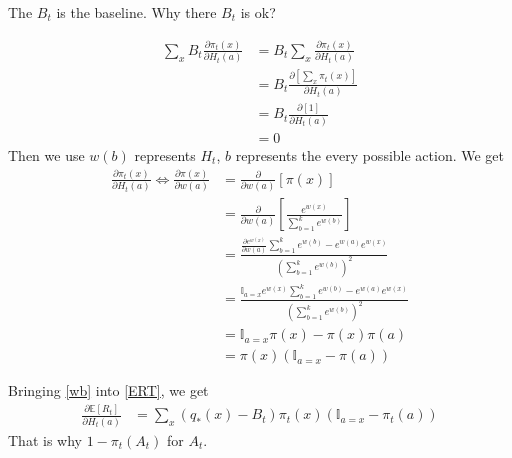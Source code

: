 \documentclass[12pt]{article}
\begin{document}
The $B_t$ is the baseline. Why there $B_t$ is ok\cite{Zhanghuiwen}? 

\begin{equation}
\begin{aligned}
	\sum_{x} B_{t} \frac{\partial \pi_{t}(x)}{\partial H_{t}(a)} &=B_{t} \sum_{x} \frac{\partial \pi_{t}(x)}{\partial H_{t}(a)} \\
	&=B_{t} \frac{\partial\left[\sum_{x} \pi_{t}(x)\right]}{\partial H_{t}(a)} \\
	&=B_{t} \frac{\partial[1]}{\partial H_{t}(a)}\\
	&=0
\end{aligned}
\end{equation}
Then we use $w(b)$ represents $H_t$, $b$ represents the every possible action. We get
\begin{equation}
	\begin{aligned}
		\frac{\partial \pi_{t}(x)}{\partial H_{t}(a)} \Leftrightarrow \frac{\partial \pi(x)}{\partial w(a)} &=\frac{\partial}{\partial w(a)}[\pi(x)] \\
		&=\frac{\partial}{\partial w(a)}\left[\frac{e^{w(x)}}{\sum_{b=1}^{k} e^{w(b)}}\right] \\
		&=\frac{\frac{\partial e^{w(x)}}{\partial w(a)} \sum_{b=1}^{k} e^{w(b)}-e^{w(a)} e^{w(x)}}{\left(\sum_{b=1}^{k} e^{w(b)}\right)^{2}} \\
		&=\frac{\mathbb{I}_{a=x} e^{w(x)} \sum_{b=1}^{k} e^{w(b)}-e^{w(a)} e^{w(x)}}{\left(\sum_{b=1}^{k} e^{w(b)}\right)^{2}} \\
		&=\mathbb{I}_{a=x} \pi(x)-\pi(x) \pi(a) \\
		&=\pi(x)\left(\mathbb{I}_{a=x}-\pi(a)\right) \label{wb}
	\end{aligned}
\end{equation}

Bringing \ref{wb} into \ref{ERT}, we get 
\begin{equation}
	\begin{aligned}
		\frac{\partial \mathbb{E}\left[R_{t}\right]}{\partial H_{t}(a)}&=\sum_{x}\left(q_{*}(x)-B_{t}\right) \pi_{t}(x)\left(\mathbb{I}_{a=x}-\pi_{t}(a)\right)
	\end{aligned}
\end{equation}
That is why $1-\pi_t(A_t)$ for $A_t$.
\newpage



\end{document}
